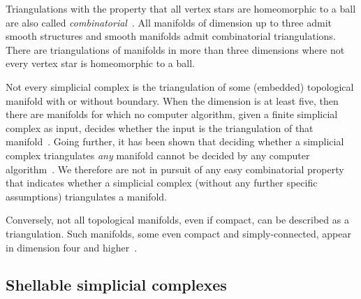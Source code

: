 \documentclass[10pt,a4paper]{article}
\begin{document}
\begin{remark}
    Triangulations with the property that all vertex stars are homeomorphic to a ball are also called \emph{combinatorial}~\cite[Section~1]{Bagchi2005}.
    All manifolds of dimension up to three admit smooth structures and smooth manifolds admit combinatorial triangulations. 
    There are triangulations of manifolds in more than three dimensions where not every vertex star is homeomorphic to a ball. 
    
    Not every simplicial complex is the triangulation of some (embedded) topological manifold with or without boundary. 
    When the dimension is at least five, then there are manifolds for which no computer algorithm, given a finite simplicial complex as input, decides whether the input is the triangulation of that manifold~\cite{chernavsky2006unrecognizability}.
    Going further, it has been shown that deciding whether a simplicial complex triangulates \emph{any} manifold cannot be decided by any computer algorithm~\cite{poonen2014undecidable}.     
    We therefore are not in pursuit of any easy combinatorial property that indicates whether a simplicial complex (without any further specific assumptions) triangulates a manifold.

    Conversely, not all topological manifolds, even if compact, can be described as a triangulation. 
    Such manifolds, some even compact and simply-connected, appear in dimension four and higher~\cite{akbulut2014casson}.
\end{remark}








\subsection{Shellable simplicial complexes}\label{subsection:shellability}
\end{document}

